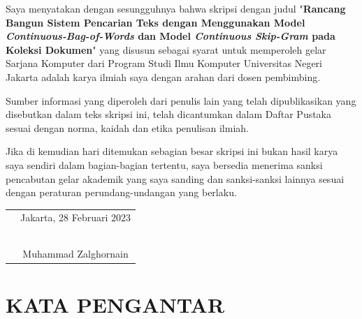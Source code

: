 \documentclass[12pt]{report}
\begin{document}
\hfill \break
Saya menyatakan dengan sesungguhnya bahwa skripsi dengan judul "\textbf{Rancang Bangun Sistem Pencarian Teks dengan Menggunakan Model \textit{Continuous-Bag-of-Words} dan Model \textit{Continuous Skip-Gram} pada Koleksi Dokumen}" yang disusun sebagai syarat untuk memperoleh gelar Sarjana Komputer dari Program Studi Ilmu Komputer Universitas Negeri Jakarta adalah karya ilmiah saya dengan arahan dari dosen pembimbing.
\newline

Sumber informasi yang diperoleh dari penulis lain yang telah dipublikasikan yang disebutkan dalam teks skripsi ini, telah dicantumkan dalam Daftar Pustaka sesuai dengan norma, kaidah dan etika penulisan ilmiah.
\newline

Jika di kemudian hari ditemukan sebagian besar skripsi ini bukan hasil karya saya sendiri dalam bagian-bagian tertentu, saya bersedia menerima sanksi pencabutan gelar akademik yang saya sanding dan sanksi-sanksi lainnya sesuai dengan peraturan perundang-undangan yang berlaku.
\newline

\begin{center}
\begin{tabular}{ m{9cm} c}
& Jakarta, 28 Februari 2023 \\
& \\
& \\
& \\
& \\
& \\
& Muhammad Zalghornain \\   
\end{tabular}
\end{center}



\linespread{1.6}\selectfont
\cleardoublepage
{}
\section*{KATA PENGANTAR}
\end{document}
